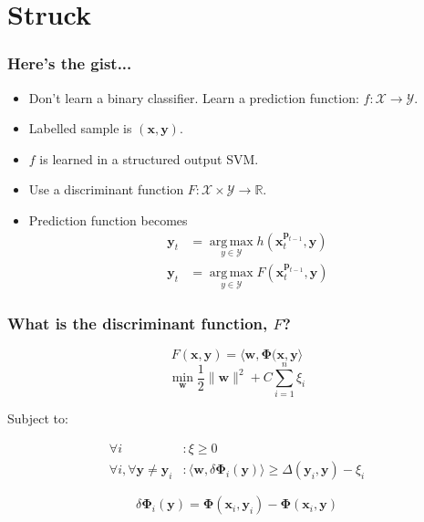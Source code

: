 \documentclass[mathserif,handout]{beamer}
\DeclareMathOperator*{\argmax}{arg\,max}
\begin{document}

\section{Struck}

\begin{frame}
    \frametitle{Here's the gist...}

    \begin{itemize}
        \item Don't learn a binary classifier. Learn a prediction function: $f :
            \mathcal{X} \rightarrow \mathcal{Y}$.
        \item Labelled sample is $(\mathbf{x}, \mathbf{y})$.
        \item $f$ is learned in a structured output SVM.
        \item Use a discriminant function $F: \mathcal{X} \times \mathcal{Y}
            \rightarrow \mathbb{R}$.
        \item Prediction function becomes %
            \begin{align}
                \mathbf{y}_t &= \argmax\limits_{y \in \mathcal{Y}} h \left( \mathbf{x}_t^{\mathbf{p}_{t-1}}, \mathbf{y} \right) \tag{prior} \\
                \mathbf{y}_t &= \argmax\limits_{y \in \mathcal{Y}} F \left( \mathbf{x}_t^{\mathbf{p}_{t-1}}, \mathbf{y} \right) \tag{Struck}
            \end{align}
    \end{itemize}
\end{frame}

\begin{frame}
    \frametitle{What is the discriminant function, $F$?}
    \begin{equation}
        F(\mathbf{x}, \mathbf{y}) = \langle \mathbf{w}, \mathbf{\Phi}(\mathbf{x}, \mathbf{y}\rangle
    \end{equation}
    \begin{equation}
        \min_{\mathbf{w}} \frac{1}{2} \|\mathbf{w}\|^2 + C \sum_{i=1}^n \xi_i
    \end{equation}

    Subject to:

    \begin{align}
        \forall i &: \xi \ge 0 \\
        \forall i, \forall \mathbf{y} \ne \mathbf{y}_i &: \langle \mathbf{w}, \delta \mathbf{\Phi}_i (\mathbf{y}) \rangle \ge \Delta (\mathbf{y}_i, \mathbf{y}) - \xi_i
    \end{align}

    \begin{equation}
        \delta \mathbf{\Phi}_i (\mathbf{y}) = \mathbf{\Phi}(\mathbf{x}_i, \mathbf{y}_i) - \mathbf{\Phi}(\mathbf{x}_i, \mathbf{y})
    \end{equation}
\end{frame}
\end{document}

